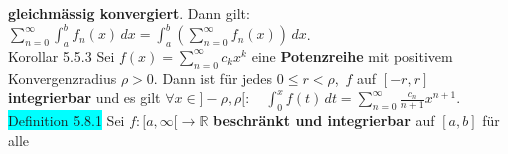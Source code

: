 \documentclass[landscape, 10pt]{article}
\newcommand{\R}{\mathbb{R}}
\begin{document}
\begin{multicols}{3}
                     \textbf{gleichmässig konvergiert}. Dann gilt: 
                     \textcolor{NavyBlue}{$\sum_{n=0}^\infty\int_a^bf_n(x)\,dx
                     =\int_a^b(\sum_{n=0}^\infty f_n(x))\,dx$}. \\
              \colorbox{BurntOrange}{Korollar 5.5.3} 
                     Sei \textcolor{NavyBlue}{$f(x)=\sum_{n=0}^\infty c_kx^k$} 
                     eine \textbf{Potenzreihe} mit positivem Konvergenzradius 
                     \textcolor{NavyBlue}{$\rho>0$}. Dann ist für jedes 
                     \textcolor{NavyBlue}{$0\leqslant r<\rho$},\,
                     \textcolor{NavyBlue}{$f$} 
                     auf \textcolor{NavyBlue}{$[-r,r]$}
                     \textbf{integrierbar} und es gilt 
                     \textcolor{NavyBlue}{$\forall x\in]-\rho,\rho[:\quad
                     \int_0^xf(t)\,dt=\sum_{n=0}^\infty\frac{c_n}{n+1}x^{n+1}$}.\\
              \colorbox{cyan}{Definition 5.8.1} 
                     Sei \textcolor{NavyBlue}{$f:[a,\infty[\longrightarrow\R$}
                     \textbf{beschränkt und integrierbar} auf 
                     \textcolor{NavyBlue}{$[a,b]$} für alle 

\end{multicols}
\end{document}
